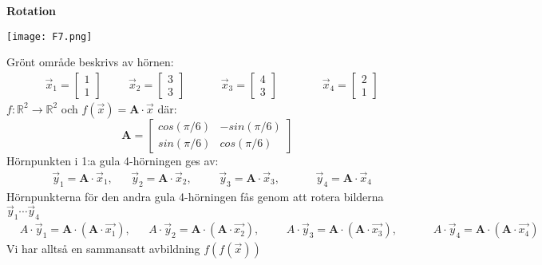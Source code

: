 \begin{Ex}
	\textbf{Rotation}
	\begin{center}
		\texttt{[image: F7.png]}
	\end{center}
    Grönt område beskrivs av hörnen:
    \begin{align*}
		&\vec{x}_1 = \begin{bmatrix} 1\\1 \end{bmatrix}
	    &&&\vec{x}_2 = \begin{bmatrix} 3\\3 \end{bmatrix}
	    &&&&\vec{x}_3 = \begin{bmatrix} 4\\3 \end{bmatrix}
	    &&&&&\vec{x}_4 = \begin{bmatrix} 2\\1 \end{bmatrix}
    \end{align*}
    $f:\mathbb{R}^2 \rightarrow \mathbb{R}^2$ och $f(\vec{x}) = \mathbf{A} \cdot \vec{x}$ där:
    \[
        \mathbf{A} = \begin{bmatrix} cos(\pi/6)&-sin(\pi/6)\\sin(\pi/6)&cos(\pi/6)\end{bmatrix} 
    \]
    Hörnpunkten i 1:a gula 4-hörningen ges av:
    \begin{align*}
    &\vec{y}_1 = \mathbf{A} \cdot \vec{x}_1,
    &&\vec{y}_2 = \mathbf{A} \cdot \vec{x}_2,
    &&&\vec{y}_3 = \mathbf{A} \cdot \vec{x}_3,
    &&&&\vec{y}_4 = \mathbf{A} \cdot \vec{x}_4
    \end{align*}
    Hörnpunkterna för den andra gula 4-hörningen fås genom att rotera bilderna $\vec{y}_1 \cdots \vec{y}_4$
    \begin{align*}
    &A \cdot \vec{y}_1 = \mathbf{A} \cdot (\mathbf{A} \cdot \vec{x_1}),
    &&A \cdot \vec{y}_2 = \mathbf{A} \cdot (\mathbf{A} \cdot \vec{x_2}),
    &&&A \cdot \vec{y}_3 = \mathbf{A} \cdot (\mathbf{A} \cdot \vec{x_3}),
    &&&&A \cdot \vec{y}_4 = \mathbf{A} \cdot (\mathbf{A} \cdot \vec{x_4})
    \end{align*}
    Vi har alltså en sammansatt avbildning $f(f(\vec{x}))$
\end{Ex}

